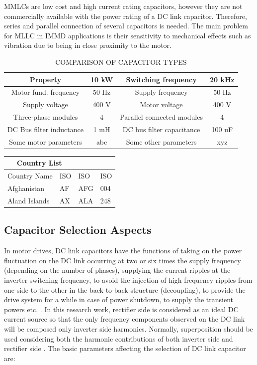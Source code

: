 \documentclass[conference,a4paper,twocolumn]{IEEEtran}
\begin{document}
MMLCs are low cost and high current rating capacitors, however they are not commercially available with the power rating of a DC link capacitor. Therefore, series and parallel connection of several capacitors is needed. The main problem for MLLC in IMMD applications is their sensitivity to mechanical effects such as vibration \cite{Brown2007} due to being in close proximity to the motor.



\begin{table}[h]
\renewcommand{\arraystretch}{1.4}
\caption{COMPARISON OF CAPACITOR TYPES}
\label{table1}
\centering
\begin{tabular}{|c|c|c|c|}
\hline
Property & 10 kW & Switching frequency & 20 kHz\\
\hline
Motor fund. frequency & 50 Hz & Supply frequency & 50 Hz\\
\hline
Supply voltage & 400 V & Motor voltage & 400 V\\
\hline
Three-phase modules & 4 & Parallel connected modules & 4\\
\hline
DC Bus filter inductance & 1 mH & DC bus filter capacitance & 100 uF\\
\hline
Some motor parameters & abc & Some other parameters & xyz\\
\hline
\end{tabular}
\end{table}


\begin{tabular}{ |p{4cm}||p{1cm}|p{1cm}|p{1cm}|  }
 \hline
 \multicolumn{2}{|c|}{Country List} \\
 \hline
 
 Country Name    & ISO  &ISO &ISO \\
 \hline
 Afghanistan   & AF    &AFG&   004\\
 Aland Islands&   AX  & ALA   &248\\

 \hline
\end{tabular}


\subsection{Capacitor Selection Aspects}

In motor drives, DC link capacitors have the functions of taking on the power fluctuation on the DC link occurring at two or six times the supply frequency (depending on the number of phases), supplying the current ripples at the inverter switching frequency, to avoid the injection of high frequency ripples from one side to the other in the back-to-back structure (decoupling), to provide the drive system for a while in case of power shutdown, to supply the transient powers etc. \cite{Bianchi2003}. In this research work, rectifier side is considered as an ideal DC current source so that the only frequency components observed on the DC link will be composed only inverter side harmonics. Normally, superposition should be used considering both the harmonic contributions of both inverter side and rectifier side \cite{Bianchi2003}.
The basic parameters affecting the selection of DC link capacitor are:
\end{document}
